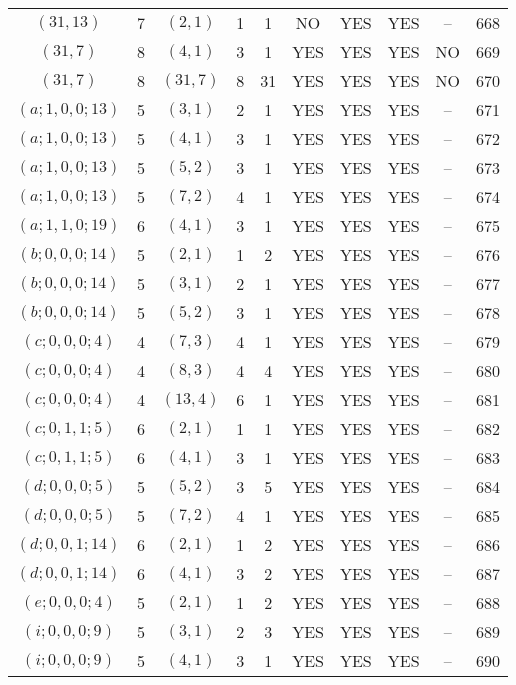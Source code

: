 \begin{longtable}{|c|c|c|c|c|c|c|c|c|c|}
$(31, 13)$ & 7 & $(2, 1)$ & 1 & 1 & NO & YES & YES & -- & 668\\
$(31, 7)$ & 8 & $(4, 1)$ & 3 & 1 & YES & YES & YES & NO & 669\\
$(31, 7)$ & 8 & $(31, 7)$ & 8 & 31 & YES & YES & YES & NO & 670\\
$(a; 1, 0, 0; 13)$ & 5 & $(3, 1)$ & 2 & 1 & YES & YES & YES & -- & 671\\
$(a; 1, 0, 0; 13)$ & 5 & $(4, 1)$ & 3 & 1 & YES & YES & YES & -- & 672\\
$(a; 1, 0, 0; 13)$ & 5 & $(5, 2)$ & 3 & 1 & YES & YES & YES & -- & 673\\
$(a; 1, 0, 0; 13)$ & 5 & $(7, 2)$ & 4 & 1 & YES & YES & YES & -- & 674\\
$(a; 1, 1, 0; 19)$ & 6 & $(4, 1)$ & 3 & 1 & YES & YES & YES & -- & 675\\
$(b; 0, 0, 0; 14)$ & 5 & $(2, 1)$ & 1 & 2 & YES & YES & YES & -- & 676\\
$(b; 0, 0, 0; 14)$ & 5 & $(3, 1)$ & 2 & 1 & YES & YES & YES & -- & 677\\
$(b; 0, 0, 0; 14)$ & 5 & $(5, 2)$ & 3 & 1 & YES & YES & YES & -- & 678\\
$(c; 0, 0, 0; 4)$ & 4 & $(7, 3)$ & 4 & 1 & YES & YES & YES & -- & 679\\
$(c; 0, 0, 0; 4)$ & 4 & $(8, 3)$ & 4 & 4 & YES & YES & YES & -- & 680\\
$(c; 0, 0, 0; 4)$ & 4 & $(13, 4)$ & 6 & 1 & YES & YES & YES & -- & 681\\
$(c; 0, 1, 1; 5)$ & 6 & $(2, 1)$ & 1 & 1 & YES & YES & YES & -- & 682\\
$(c; 0, 1, 1; 5)$ & 6 & $(4, 1)$ & 3 & 1 & YES & YES & YES & -- & 683\\
$(d; 0, 0, 0; 5)$ & 5 & $(5, 2)$ & 3 & 5 & YES & YES & YES & -- & 684\\
$(d; 0, 0, 0; 5)$ & 5 & $(7, 2)$ & 4 & 1 & YES & YES & YES & -- & 685\\
$(d; 0, 0, 1; 14)$ & 6 & $(2, 1)$ & 1 & 2 & YES & YES & YES & -- & 686\\
$(d; 0, 0, 1; 14)$ & 6 & $(4, 1)$ & 3 & 2 & YES & YES & YES & -- & 687\\
$(e; 0, 0, 0; 4)$ & 5 & $(2, 1)$ & 1 & 2 & YES & YES & YES & -- & 688\\
$(i; 0, 0, 0; 9)$ & 5 & $(3, 1)$ & 2 & 3 & YES & YES & YES & -- & 689\\
$(i; 0, 0, 0; 9)$ & 5 & $(4, 1)$ & 3 & 1 & YES & YES & YES & -- & 690
\end{longtable}
